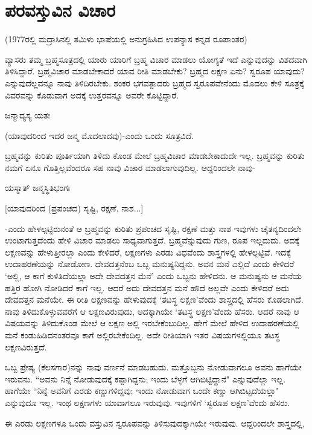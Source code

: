 \chapter{ಪರವಸ್ತುವಿನ ವಿಚಾರ}\label{chap13}

(1977ರಲ್ಲಿ ಮದ್ರಾಸಿನಲ್ಲಿ ತಮಿಳು ಭಾಷೆಯಲ್ಲಿ  ಅನುಗ್ರಹಿಸಿದ ಉಪನ್ಯಾಸ  ಕನ್ನಡ ರೂಪಾಂತರ)

ವ್ಯಾಸರು ತಮ್ಮ ಬ್ರಹ್ಮಸೂತ್ರದಲ್ಲಿ ಯಾರು ಯಾರಿಗೆ ಬ್ರಹ್ಮ ವಿಚಾರ ಮಾಡಲು ಯೋಗ್ಯತೆ ಇದೆ ಎನ್ನುವುದನ್ನು ವಿಶದವಾಗಿ ತಿಳಿಸಿದ್ದಾರೆ. ಬ್ರಹ್ಮವಿಚಾರ ಮಾಡಬೇಕಾದರೆ ಯಾವ ರೀತಿ ಮಾಡಬೇಕು? ಬ್ರಹ್ಮದ ಲಕ್ಷಣ ಏನು? ಸ್ವರೂಪ  ಯಾವುದು? ಎನ್ನುವುದೆಲ್ಲವನ್ನೂ ನಾವು ತಿಳಿದಿರಬೇಕು. ಶಂಕರ ಭಗವತ್ಪಾದರು ಬ್ರಹ್ಮದ ಸ್ವರೂಪವೇನೆಂದು ಮೊದಲು ಕೇಳಿ ಸೂತ್ರಕ್ಕೆ ವಿವರವನ್ನು ಕೊಡುವಾಗ ಅದಕ್ಕೆ ಉತ್ತರವನ್ನೂ ಅವರೇ ಕೊಟ್ಟಿದ್ದಾರೆ. 

ಜನ್ಮಾದ್ಯಸ್ಯ ಯತಃ

(ಯಾವುದರಿಂದ ಇದರ ಜನ್ಮ ಮೊದಲಾದವು)-ಎಂದು ಒಂದು ಸೂತ್ರವಿದೆ. 

ಬ್ರಹ್ಮವನ್ನು ಕುರಿತು ಪೂರ್ತಿಯಾಗಿ ತಿಳಿದು ಕೊಂಡ ಮೇಲೆ ಬ್ರಹ್ಮವಿಚಾರ ಮಾಡಬೇಕಾದುದೇ ಇಲ್ಲ. ಬ್ರಹ್ಮವನ್ನು ಕುರಿತು ನಮಗೆ ಏನೂ ಗೊತ್ತಿಲ್ಲವೆಂದರೂ ಸಹ ನಾವು ವಿಚಾರ ಮಾಡಲಾಗುವುದಿಲ್ಲ. ಆದ್ದರಿಂದಲೇ ನಾವು- 

ಯಸ್ಮಾತ್ ಜನ್ಮಸ್ಥಿತಿಭಂಗಃ

[ಯಾವುದರಿಂದ (ಪ್ರಪಂಚದ) ಸೃಷ್ಟಿ, ರಕ್ಷಣೆ, ನಾಶ...]

-ಎಂದು ಹೇಳಲ್ಪಟ್ಟಿರುನಂತೆ ಆ ಬ್ರಹ್ಮವನ್ನು ಕುರಿತು ಪ್ರಪಂಚದ ಸೃಷ್ಟಿ, ರಕ್ಷಣೆ ಮತ್ತು ನಾಶ ಇವುಗಳು  ಚೈತನ್ಯದಿಂದಲೇ ಉಂಟಾಗುತ್ತದೆಂದು ಹೇಳಿ ವಿಚಾರ ಮಾಡಲು ಸಾಧ್ಯವಾಗುತ್ತದೆ. ಬ್ರಹ್ಮವೆನ್ನುವುದು ಗುಣ, ರೂಪ ಇಲ್ಲದುದು. ಅದಕ್ಕೆ ಲಕ್ಷಣವನ್ನು ಹೇಳುತ್ತೀರಲ್ಲಾ ಎಂದು ಕೇಳಿದರೆ, ಲಕ್ಷಣಗಳು ಎರಡು ವಿಧವೆಂದು ಶಾಸ್ತ್ರಗಳಲ್ಲಿ  ಹೇಳಲ್ಪಟ್ಟಿವೆ. ಇದಕ್ಕೆ ಉದಾಹರಣೆಯನ್ನು ನೋಡೋಣ. ದೇವದತ್ತನೆಂಬ ಒಬ್ಬ  ಮನುಷ್ಯನಿದ್ದನು. ಅವನ ಮನೆ ಎಲ್ಲಿದೆ ಎಂದು ಕೇಳಿದರೆ `ಅಲ್ಲಿ, ಆ ಕಾಗೆ ಕುಳಿತಿದೆಯಲ್ಲಾ  ಅದೇ ದೇವದತ್ತನ ಮೆನೆ' ಎಂದು ಒಬ್ಬನು ಹೇಳಿದನು. ಆ ಮನುಷ್ಯನು ಆ ಮನೆಯ ಹತ್ತಿರ ಹೋಗಿ  ನೋಡಿದರೆ ಕಾಗೆ ಇಲ್ಲ. ಆದರೆ ಅದು ದೇವದತ್ತನ ಮನೆ ಹೌದೆ ಅಲ್ಲವೇ ಎಂದು ಕೇಳಿದರೆ ಅದು ದೇವದತ್ತನ ಮನೆಯೇ. ಈ ರೀತಿ ಲಕ್ಷಣವನ್ನು ಹೇಳುವುದಕ್ಕೆ `ತಟಸ್ಥ ಲಕ್ಷಣ'ವೆಂದು ಶಾಸ್ತ್ರದಲ್ಲಿ ಹೆಸರು ಕೊಡಲಾಗಿದೆ. ನಾವು ತಿಳಿದುಕೊಳ್ಳುವವರೆಗೆ ಆ  ಲಕ್ಷಣವಿರುವುದು, ಅದಕ್ಕಾಗಿಯೇ `ತಟಸ್ಥ ಲಕ್ಷಣ'ವೆಂದು ಹೆಸರು. ಆದರೆ ನಾವು ಆ ವಿಷಯವನ್ನು ತಿಳಿದುಕೊಂಡ ಮೇಲೆ ಆ ಲಕ್ಷಣ ಅಲ್ಲಿ ಇರಬೇಕೆಂಬುದಿಲ್ಲ. ಹೇಗೆ ಮೇಲೆ ಹೇಳಿದ ಉದಾಹರಣೆಯಲ್ಲಿ ಮನೆ ಕಂಡುಹಿಡಿದನಂತರವೂ ಕಾಗೆ ಅಲ್ಲಿರಬೇಕೆಂದಿಲ್ಲ. ಅದೇ ರೀತಿಯಾಗಿ ಇತರ ವಿಷಯಗಳಲ್ಲಿಯೂ ತಟಸ್ಥ ಲಕ್ಷಣವಿರುತ್ತದೆ. 

ಒಬ್ಬ ಪ್ರೇಷ್ಯ (ಕೆಲಸಗಾರ)ನನ್ನು ನಾವು ವರ್ಣನೆ ಮಾಡಬಹುದು. ಮತ್ತೊಬ್ಬನು ನೋಡುವಾಗಲೂ ಅವನು ಹಾಗೆಯೇ ಇರುವನು. ``ಅವನು ನಿನ್ನೆ  ನೋಡುವುದಕ್ಕೆ  ಕಪ್ಪಾಗಿದ್ದನು; ಇಂದು ಬೆಳ್ಳಗೆ ಆಗಿಬಿಟ್ಟಿದ್ದಾನೆ" ಎನ್ನುವುದೆಲ್ಲಾ ಇಲ್ಲ. ಹಾಗೆಯೇ ``ನಿನ್ನೆ ಅವನಿಗೆ ಎರಡು ಕಣ್ಣುಗಳಿದ್ದವು; ಇಂದು ನೋಡುವಾಗ ಒಂದೇ ಕಣ್ಣು ಆಗಿಬಿಟ್ಟದೆಯಲ್ಲಾ" ಎನ್ನುವುದೂ ಇಲ್ಲ. ಇಂಥ ಲಕ್ಷಣಗಳು ಯಾವಾಗಲೂ ಇರುವುವು. ಇವುಗಳಿಗೆ `ಸ್ವರೂಪ ಲಕ್ಷಣ'ವೆಂದು ಹೆಸರು.

ಈ ಎರಡು ಲಕ್ಷಣಗಳೂ ಒಂದು ವಸ್ತುವಿನ ಸ್ವರೂಪವನ್ನು ತಿಳಿಸುವುದಕ್ಕಾಗಿಯೇ ಇರುವುವು. ಆದ್ದರಿಂದಲೇ ಶಾಸ್ತ್ರದಲ್ಲಿ,

